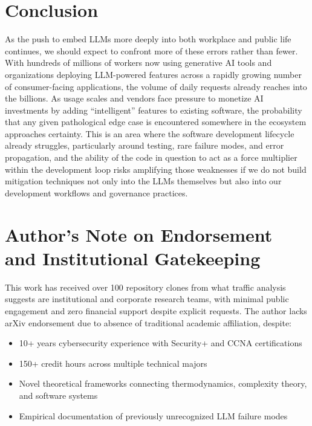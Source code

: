 \documentclass[11pt]{article}
\begin{document}
\section{Conclusion}
As the push to embed LLMs more deeply into both workplace and public life continues, we should expect to confront more of these errors rather than fewer. With hundreds of millions of workers now using generative AI tools and organizations deploying LLM-powered features across a rapidly growing number of consumer-facing applications, the volume of daily requests already reaches into the billions.\cite{llm_stats_hostinger,ai_usage_deloitte,genai_usage_secondtalent} As usage scales and vendors face pressure to monetize AI investments by adding “intelligent” features to existing software, the probability that any given pathological edge case is encountered somewhere in the ecosystem approaches certainty. This is an area where the software development lifecycle already struggles, particularly around testing, rare failure modes, and error propagation, and the ability of the code in question to act as a force multiplier within the development loop risks amplifying those weaknesses if we do not build mitigation techniques not only into the LLMs themselves but also into our development workflows and governance practices.\cite{llm_guardrails_heavybit,llm_security_quzara,owasp_llm_security}

\section*{Author's Note on Endorsement and Institutional Gatekeeping}

This work has received over 100 repository clones from what traffic analysis suggests are institutional and corporate research teams, with minimal public engagement and zero financial support despite explicit requests. The author lacks arXiv endorsement due to absence of traditional academic affiliation, despite:

\begin{itemize}
    \item 10+ years cybersecurity experience with Security+ and CCNA certifications
    \item 150+ credit hours across multiple technical majors
    \item Novel theoretical frameworks connecting thermodynamics, complexity theory, and software systems
    \item Empirical documentation of previously unrecognized LLM failure modes
\end{itemize}
\end{document}
